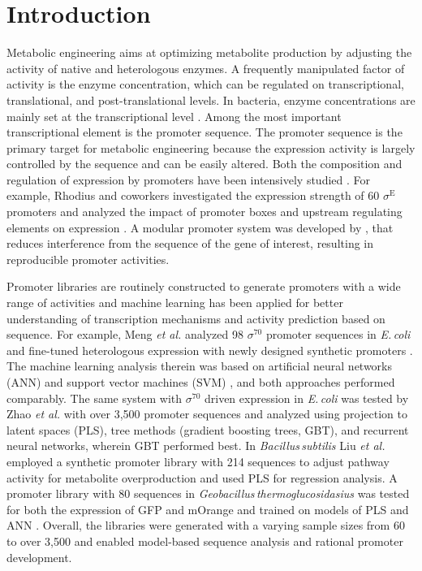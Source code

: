 \documentclass[utf8]{frontiersSCNS} %
\begin{document}
\section{Introduction}

Metabolic engineering aims at optimizing metabolite production by adjusting the activity of native and heterologous enzymes. A frequently manipulated factor of activity is the enzyme concentration, which can be regulated on transcriptional, translational, and post-translational levels. In bacteria, enzyme concentrations are mainly set at the transcriptional level \citep{Balakrishnan2021}. Among the most important transcriptional element is the promoter sequence. The promoter sequence is the primary target for metabolic engineering because the expression activity is largely controlled by the sequence and can be easily altered. Both the composition and regulation of expression by promoters have been intensively studied \citep{Kalisky2007, zaslaver2009invariant, Kochanowski2017}. For example, Rhodius and coworkers investigated the expression strength of 60 $\sigma^{\mathrm{E}}$ promoters and analyzed the impact of promoter boxes and upstream regulating elements on expression \citep{Rhodius2010,Rhodius2012}. A modular promoter system was developed by \cite{Mutalik2013}, that reduces interference from the sequence of the gene of interest, resulting in reproducible promoter activities. 

Promoter libraries are routinely constructed to generate promoters with a wide range of activities \citep{Jensen1993, Alper2005, Hammer2006, Balzer2013, Kobbing2020} and machine learning has been applied for better understanding of transcription mechanisms and activity prediction based on sequence. For example, Meng \textit{et al.} analyzed 98 $\sigma^{\mathrm{70}}$ promoter sequences in \textit{E.\,coli} and fine-tuned heterologous expression with newly designed synthetic promoters \citep{Meng2013, Meng2017}. The machine learning analysis therein was based on artificial neural networks (ANN) \citep{Meng2013} and support vector machines (SVM) \citep{Meng2017}, and both approaches performed comparably. The same system with $\sigma^{\mathrm{70}}$ driven expression in \textit{E.\,coli} was tested by Zhao \textit{et al.} with over 3,500 promoter sequences \citep{Zhao2020} and analyzed using projection to latent spaces (PLS), tree methods (gradient boosting trees, GBT), and recurrent neural networks, wherein GBT performed best. In \textit{Bacillus\,subtilis} Liu \textit{et al.} employed a synthetic promoter library with 214 sequences to adjust pathway activity for metabolite overproduction \citep{liu2018construction} and used PLS for regression analysis. A promoter library with 80 sequences in \textit{Geobacillus\,thermoglucosidasius} was tested for both the expression of GFP and mOrange and trained on models of PLS and ANN \citep{Gilman2019}. Overall, the libraries were generated with a varying sample sizes from 60 to over 3,500 and enabled model-based sequence analysis and rational promoter development. 
\end{document}
